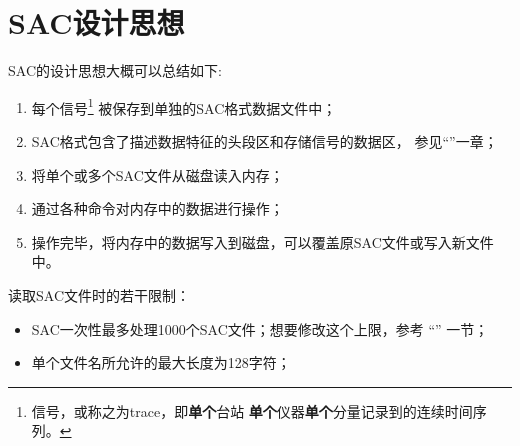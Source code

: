 \section{SAC设计思想}
SAC的设计思想大概可以总结如下:
\begin{enumerate}
\item 每个信号\footnote{信号，或称之为trace，即\textbf{单个}台站
    \textbf{单个}仪器\textbf{单个}分量记录到的连续时间序列。}
    被保存到单独的SAC格式数据文件中；
\item SAC格式包含了描述数据特征的头段区和存储信号的数据区，
    参见``''一章；
\item 将单个或多个SAC文件从磁盘读入内存；
\item 通过各种命令对内存中的数据进行操作；
\item 操作完毕，将内存中的数据写入到磁盘，可以覆盖原SAC文件或写入新文件中。
\end{enumerate}

读取SAC文件时的若干限制：
\begin{itemize}
\item SAC一次性最多处理1000个SAC文件；想要修改这个上限，参考
    ``'' 一节；
\item 单个文件名所允许的最大长度为128字符；
\end{itemize}
